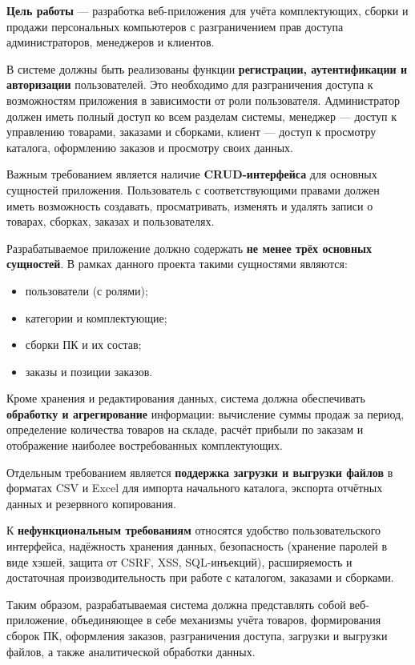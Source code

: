 \documentclass[14pt, a4paper]{extarticle}
\begin{document}
\textbf{Цель работы} --- разработка веб-приложения для учёта комплектующих, сборки и продажи персональных компьютеров с разграничением прав доступа администраторов, менеджеров и клиентов.

В системе должны быть реализованы функции \textbf{регистрации, аутентификации и авторизации} пользователей. Это необходимо для разграничения доступа к возможностям приложения в зависимости от роли пользователя. Администратор должен иметь полный доступ ко всем разделам системы, менеджер --- доступ к управлению товарами, заказами и сборками, клиент --- доступ к просмотру каталога, оформлению заказов и просмотру своих данных.

Важным требованием является наличие \textbf{CRUD-интерфейса} для основных сущностей приложения. Пользователь с соответствующими правами должен иметь возможность создавать, просматривать, изменять и удалять записи о товарах, сборках, заказах и пользователях.

Разрабатываемое приложение должно содержать \textbf{не менее трёх основных сущностей}. В рамках данного проекта такими сущностями являются:
\begin{itemize}
    \item пользователи (с ролями);
    \item категории и комплектующие;
    \item сборки ПК и их состав;
    \item заказы и позиции заказов.
\end{itemize}

Кроме хранения и редактирования данных, система должна обеспечивать \textbf{обработку и агрегирование} информации: вычисление суммы продаж за период, определение количества товаров на складе, расчёт прибыли по заказам и отображение наиболее востребованных комплектующих.

Отдельным требованием является \textbf{поддержка загрузки и выгрузки файлов} в форматах CSV и Excel для импорта начального каталога, экспорта отчётных данных и резервного копирования.

К \textbf{нефункциональным требованиям} относятся удобство пользовательского интерфейса, надёжность хранения данных, безопасность (хранение паролей в виде хэшей, защита от CSRF, XSS, SQL-инъекций), расширяемость и достаточная производительность при работе с каталогом, заказами и сборками.

Таким образом, разрабатываемая система должна представлять собой веб-приложение, объединяющее в себе механизмы учёта товаров, формирования сборок ПК, оформления заказов, разграничения доступа, загрузки и выгрузки файлов, а также аналитической обработки данных.
\end{document}
